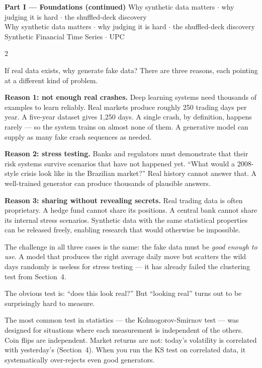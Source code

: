 \documentclass[10pt]{article}
\newcommand{\skybox}[2]{\begin{tcolorbox}[mybox={Sky}{BBg},title={#1}]#2\end{tcolorbox}}
\newcommand{\pagehead}[2]{%
  \begin{tcolorbox}[enhanced,arc=0pt,outer arc=0pt,boxrule=0pt,
    colback=Navy,colframe=Navy,
    top=5pt,bottom=5pt,left=8pt,right=8pt,
    before skip=0pt,after skip=10pt]
  {\color{white}\large\bfseries #1}%
  \ifx\relax#2\relax\else\\[1pt]{\color{blue!30!white}\small #2}\fi
  \hfill{\color{blue!20!white}\footnotesize Synthetic Financial Time Series $\cdot$ UPC}
  \end{tcolorbox}}
\begin{document}
\clearpage

\pagehead{Part I --- Foundations (continued)}
         {Why synthetic data matters $\cdot$ why judging it is hard $\cdot$ the shuffled-deck discovery}

\begin{multicols}{2}

\skybox{5\quad Why Anyone Wants Synthetic Markets}{%
If real data exists, why generate fake data? There are three reasons, each pointing at a different kind of problem.

\medskip
\textbf{Reason 1: not enough real crashes.} Deep learning systems need thousands of examples to learn reliably. Real markets produce roughly 250 trading days per year. A five-year dataset gives 1{,}250 days. A single crash, by definition, happens rarely --- so the system trains on almost none of them. A generative model can supply as many fake crash sequences as needed.

\medskip
\textbf{Reason 2: stress testing.} Banks and regulators must demonstrate that their risk systems survive scenarios that have not happened yet. ``What would a 2008-style crisis look like in the Brazilian market?'' Real history cannot answer that. A well-trained generator can produce thousands of plausible answers.

\medskip
\textbf{Reason 3: sharing without revealing secrets.} Real trading data is often proprietary. A hedge fund cannot share its positions. A central bank cannot share its internal stress scenarios. Synthetic data with the same statistical properties can be released freely, enabling research that would otherwise be impossible.

\smallskip
The challenge in all three cases is the same: the fake data must be \emph{good enough to use}. A model that produces the right average daily move but scatters the wild days randomly is useless for stress testing --- it has already failed the clustering test from Section~4.}

\skybox{6\quad Why Judging It Is Hard}{%
The obvious test is: ``does this look real?'' But ``looking real'' turns out to be surprisingly hard to measure.

The most common test in statistics --- the Kolmogorov-Smirnov test --- was designed for situations where each measurement is independent of the others. Coin flips are independent. Market returns are not: today's volatility is correlated with yesterday's (Section~4). When you run the KS test on correlated data, it systematically over-rejects even good generators.

}
\end{multicols}
\end{document}
